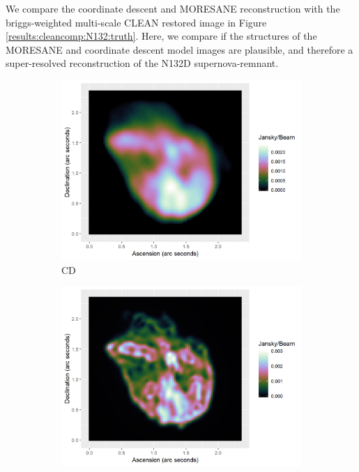 We compare the coordinate descent and MORESANE reconstruction with the briggs-weighted multi-scale CLEAN restored image in Figure \ref{results:cleancomp:N132:truth}. Here, we compare if the structures of the MORESANE and coordinate descent model images are plausible, and therefore a super-resolved reconstruction of the N132D supernova-remnant.

\begin{figure}[h]
	\centering
	\begin{subfigure}{0.3\linewidth}
		\includegraphics[width=1.00\linewidth]{./chapters/10.results/SerialCD/CD-N132.png}
		\caption{CD}
	\end{subfigure}
	\begin{subfigure}{0.3\linewidth}
		\includegraphics[width=1.00\linewidth]{./chapters/10.results/iuwt/iuwt-N132.png}

\end{subfigure}
\end{figure}
